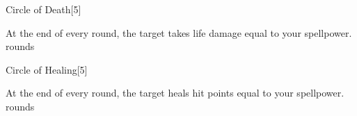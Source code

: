 \begin{spellsection}{Circle of Death}[5]
    \begin{spellheader}
    \end{spellheader}
    \begin{spellcontent}
        \begin{spelltargetinginfo}
        \end{spelltargetinginfo}
        \begin{spelleffects}
            \spelleffect At the end of every round, the target takes life damage equal to your spellpower.
             rounds
        \end{spelleffects}
    \end{spellcontent}
    \begin{spellfooter}
        \miscastexplode
    \end{spellfooter}
\end{spellsection}

\begin{spellsection}{Circle of Healing}[5]
    \begin{spellheader}
    \end{spellheader}
    \begin{spellcontent}
        \begin{spelltargetinginfo}
        \end{spelltargetinginfo}
        \begin{spelleffects}
            \spelleffect At the end of every round, the target heals hit points equal to your spellpower.
             rounds
        \end{spelleffects}
    \end{spellcontent}
    \begin{spellfooter}
        \miscastexplode
    \end{spellfooter}
\end{spellsection}

